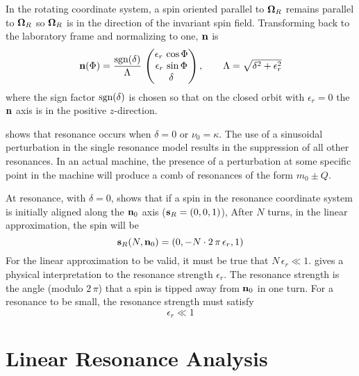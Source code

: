 In the rotating coordinate system, a spin oriented parallel to ${\bf \Omega}_R$ remains parallel to
${\bf \Omega}_R$ so ${\bf \Omega}_R$ is in the direction of the invariant spin field. Transforming back
to the laboratory frame and normalizing to one, ${\bf n}$ is
\begin{equation}
  {\bf n} (\Phi) = \frac{{\text{sgn}}(\delta)}{\Lambda} \, 
  \begin{pmatrix}
    \epsilon_r \, \cos \Phi \\
    \epsilon_r \, \sin \Phi \\
    \delta
  \end{pmatrix},
  \qquad
  \Lambda = \sqrt{\delta^2 + \epsilon_r^2}
  \label{nsdl}
\end{equation}
where the sign factor ${\text{sgn}}(\delta)$ is chosen so that on the closed orbit with $\epsilon_r = 0$
the ${\bf n}$ axis is in the positive $z$-direction.

 shows that resonance occurs when $\delta = 0$ or $\nu_0 = \kappa$.  The use of a
sinusoidal perturbation in the single resonance model results in the suppression of all other
resonances.  In an actual machine, the presence of a perturbation at some specific point in the
machine will produce a comb of resonances of the form $m_0 \pm Q$.

At resonance, with $\delta = 0$,  shows that if a spin in the resonance coordinate system
is initially aligned along the ${\bf n}_0$ axis (${\bf s}_R = (0, 0, 1)$), After $N$ turns, in the linear
approximation, the spin will be
\begin{equation}
  {\bf s}_R(N,{\bf n}_0) = (0, -N \cdot 2 \, \pi \, \epsilon_r, 1)
  \label{sr0n}
\end{equation}
For the linear approximation to be valid, it must be true that $N \, \epsilon_r \ll 1$. 
gives a physical interpretation to the resonance strength $\epsilon_r$. The resonance strength is
the angle (modulo $2 \, \pi$) that a spin is tipped away from ${\bf n}_0$ in one turn. For a resonance
to be small, the resonance strength must satisfy
\begin{equation}
  \epsilon_r \ll 1
  \label{r1}
\end{equation}

\section{Linear Resonance Analysis}
\label{s:spin.res1}

